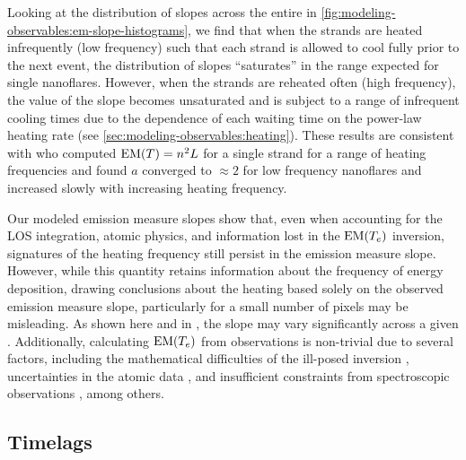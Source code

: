 Looking at the distribution of slopes across the entire \AR{} in \autoref{fig:modeling-observables:em-slope-histograms}, we find that when the strands are heated infrequently (low frequency) such that each strand is allowed to cool fully prior to the next event, the distribution of slopes ``saturates'' in the range expected for single nanoflares. However, when the strands are reheated often (high frequency), the value of the slope becomes unsaturated and is subject to a range of infrequent cooling times due to the dependence of each waiting time on the power-law heating rate (see \autoref{sec:modeling-observables:heating}). These results are consistent with \citet{cargill_active_2014} who computed $\emd[T]=n^2L$ for a single strand for a range of heating frequencies and found $a$ converged to $\approx2$ for low frequency nanoflares and increased slowly with increasing heating frequency.

Our modeled emission measure slopes show that, even when accounting for the LOS integration, atomic physics, and information lost in the $\emd$ inversion, signatures of the heating frequency still persist in the emission measure slope. However, while this quantity retains information about the frequency of energy deposition, drawing conclusions about the heating based solely on the observed emission measure slope, particularly for a small number of pixels may be misleading. As shown here and in \citet{del_zanna_evolution_2015}, the slope may vary significantly across a given \AR{}. Additionally, calculating $\emd$ from observations is non-trivial due to several factors, including the mathematical difficulties of the ill-posed inversion \citep{craig_fundamental_1976,judge_failure_1995,judge_fundamental_1997}, uncertainties in the atomic data \citep{guennou_can_2013}, and insufficient constraints from spectroscopic observations \citep[e.g.][]{landi_isothermality_2010,winebarger_defining_2012}, among others.

\subsection{Timelags}\label{sec:modeling-observables:timelags}

